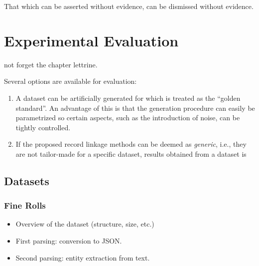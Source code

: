 \begin{savequote}[75mm] 
That which can be asserted without evidence, can be dismissed without evidence.
\end{savequote}




\chapter{Experimental Evaluation}
\label{ch:experiments}

 not forget the chapter lettrine.\vspace{2cm}

Several options are available for evaluation:

\begin{enumerate}
    \item A dataset can be artificially generated for which is treated as the ``golden standard''. An advantage of this is that the generation procedure can easily be parametrized so certain aspects, such as the introduction of noise, can be tightly controlled.
    \item If the proposed record linkage methods can be deemed as \emph{generic}, i.e., they are not tailor-made for a specific dataset, results obtained from a dataset is
\end{enumerate}




\section{Datasets}
\label{sec:datasets}




\subsection{Fine Rolls}
\label{subsec:fine_rolls}

\begin{itemize}
	\item Overview of the dataset (structure, size, etc.)
	\item First parsing: conversion to JSON.
	\item Second parsing: entity extraction from text.
\end{itemize}


